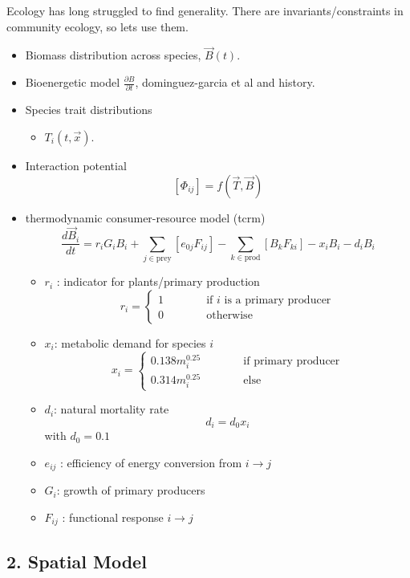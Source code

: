 Ecology has long struggled to find generality. There are
invariants/constraints in community ecology, so lets use them.

\begin{itemize}
\item
  Biomass distribution across species, \(\vec{B}(t)\).
\item
  Bioenergetic model \(\frac{\partial B}{\partial t}\), dominguez-garcia
  et al and history.
\item
  Species trait distributions

  \begin{itemize}
  \tightlist
  \item
    \(T_i(t, \vec{x})\).
  \end{itemize}
\item
  Interaction potential \[[ \Phi_{ij}  ] = f(\vec{T}, \vec{B})\]
\item
  thermodynamic consumer-resource model (tcrm)
  \[\frac{d\vec{B}_i}{dt} = r_i G_i B_i + \sum_{j \in \text{prey}} [e_{0j}F_{ij}] - \sum_{k \in \text{prod}} [B_k F_{ki}] - x_i B_i - d_i B_i\]

  \begin{itemize}
  \tightlist
  \item
    \(r_i\) : indicator for plants/primary production
    \[r_i = \begin{cases} 1 \quad\quad\quad &\text{if } i \text{ is a primary producer} \\ 0 &\text{otherwise}\end{cases}\]
  \item
    \(x_i\): metabolic demand for species \(i\)
    \[x_i = \begin{cases} 0.138m_i^{0.25} \quad\quad\quad & \text{if primary producer} \\ 0.314m_i^{0.25} & \text{else} \end{cases}\]
  \item
    \(d_i\): natural mortality rate \[d_i  = d_0 x_i \] with
    \(d_0 = 0.1\)
  \item
    \(e_{ij}\) : efficiency of energy conversion from \(i \to j\)
  \item
    \(G_i\): growth of primary producers
  \item
    \(F_{ij}\) : functional response \(i \to j\)
  \end{itemize}
\end{itemize}

\hypertarget{spatial-model}{%
\subsection{2. Spatial Model}\label{spatial-model}}

